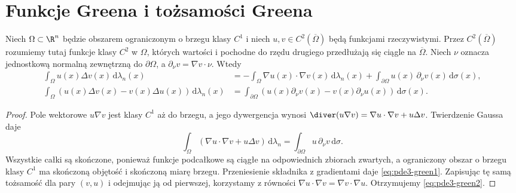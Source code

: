 \section{Funkcje Greena i tożsamości Greena}
\label{sec:pde3-green}

\begin{stwierdzenie}
\label{prop:pde3-green-identities}
Niech $\Omega\subset\R^n$ będzie obszarem ograniczonym
o brzegu klasy $C^1$ i niech $u,v\in C^2(\overline\Omega)$
będą funkcjami rzeczywistymi. Przez $C^2(\overline\Omega)$
rozumiemy tutaj funkcje klasy $C^2$ w $\Omega$, których
wartości i pochodne do rzędu drugiego przedłużają się
ciągle na $\overline\Omega$. Niech $\nu$ oznacza
jednostkową normalną zewnętrzną do $\partial\Omega$,
a $\partial_\nu v=\nabla v\cdot\nu$. Wtedy
\begin{align}
 \int_\Omega u(x)\Delta v(x)\,\mathrm d\lambda_n(x)
 &=-\int_\Omega\nabla u(x)\cdot\nabla v(x)\,\mathrm d\lambda_n(x)
 +\int_{\partial\Omega}u(x)\,\partial_\nu v(x)\,\mathrm d\sigma(x),
 \label{eq:pde3-green1}\\
 \int_\Omega(u(x)\Delta v(x)-v(x)\Delta u(x))\,\mathrm d\lambda_n(x)
 &=\int_{\partial\Omega}(u(x)\partial_\nu v(x)-v(x)\partial_\nu u(x))
 \,\mathrm d\sigma(x).\label{eq:pde3-green2}
\end{align}
\end{stwierdzenie}
\begin{proof}
Pole wektorowe $u\nabla v$ jest klasy $C^1$
aż do brzegu, a jego dywergencja wynosi
$\diver(u\nabla v)=\nabla u\cdot\nabla v+u\Delta v$.
Twierdzenie Gaussa daje
\[
 \int_\Omega(\nabla u\cdot\nabla v+u\Delta v)\,
 \mathrm d\lambda_n
 =\int_{\partial\Omega}u\,\partial_\nu v\,\mathrm d\sigma.
\]
Wszystkie całki są skończone, ponieważ funkcje
podcałkowe są ciągłe na odpowiednich zbiorach
zwartych, a ograniczony obszar o brzegu klasy $C^1$
ma skończoną objętość i skończoną miarę brzegu.
Przeniesienie składnika z gradientami daje
\eqref{eq:pde3-green1}. Zapisując tę samą tożsamość
dla pary $(v,u)$ i odejmując ją od pierwszej,
korzystamy z równości $\nabla u\cdot\nabla v
=\nabla v\cdot\nabla u$. Otrzymujemy
\eqref{eq:pde3-green2}.
\end{proof}

